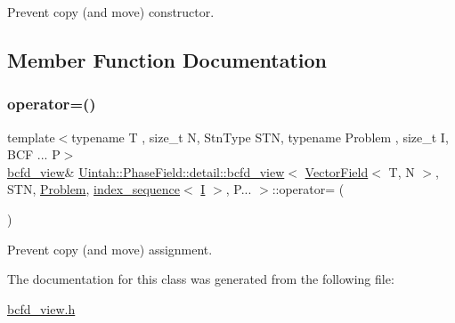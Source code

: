 Prevent copy (and move) constructor. 



\subsection{Member Function Documentation}
\mbox{\label{classUintah_1_1PhaseField_1_1detail_1_1bcfd__view_3_01VectorField_3_01T_00_01N_01_4_00_01STN_00_1a8b5a6da126f9f6f13d940aa745f239_a85279cdc6a38b63bdcfae93ee3ce8a9c}} 
\subsubsection{\texorpdfstring{operator=()}{operator=()}}
{\footnotesize\ttfamily template$<$typename T , size\+\_\+t N, Stn\+Type S\+TN, typename Problem , size\+\_\+t I, B\+C\+F ... P$>$ \\
\hyperlink{classUintah_1_1PhaseField_1_1detail_1_1bcfd__view}{bcfd\+\_\+view}\& \hyperlink{classUintah_1_1PhaseField_1_1detail_1_1bcfd__view}{Uintah\+::\+Phase\+Field\+::detail\+::bcfd\+\_\+view}$<$ \hyperlink{structUintah_1_1PhaseField_1_1VectorField}{Vector\+Field}$<$ T, N $>$, S\+TN, \hyperlink{classUintah_1_1PhaseField_1_1Problem}{Problem}, \hyperlink{namespaceUintah_1_1PhaseField_a237de804d99512e50613aff7c94a9461}{index\+\_\+sequence}$<$ \hyperlink{structUintah_1_1PhaseField_1_1I}{I} $>$, P... $>$\+::operator= (\begin{DoxyParamCaption}\item[{const \hyperlink{classUintah_1_1PhaseField_1_1detail_1_1bcfd__view}{bcfd\+\_\+view}$<$ \hyperlink{structUintah_1_1PhaseField_1_1VectorField}{Vector\+Field}$<$ T, N $>$, S\+TN, \hyperlink{classUintah_1_1PhaseField_1_1Problem}{Problem}, \hyperlink{namespaceUintah_1_1PhaseField_a237de804d99512e50613aff7c94a9461}{index\+\_\+sequence}$<$ \hyperlink{structUintah_1_1PhaseField_1_1I}{I} $>$, P... $>$ \&}]{ }\end{DoxyParamCaption})\hspace{0.3cm}{\ttfamily [delete]}}



Prevent copy (and move) assignment. 



The documentation for this class was generated from the following file\+:\begin{DoxyCompactItemize}
\item 
\hyperlink{bcfd__view_8h}{bcfd\+\_\+view.\+h}\end{DoxyCompactItemize}
